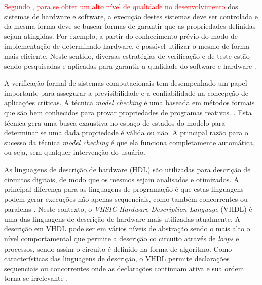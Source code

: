 \par
\textcolor{red}{Segundo \cite{rocha2015verificaccao}, para se obter um alto nível de qualidade no desenvolvimento} dos sistemas de hardware e software, a execução destes sistemas deve ser controlada e da mesma forma deve-se buscar formas de garantir que as propriedades definidas sejam atingidas. Por exemplo, a partir do conhecimento prévio do modo de implementação de determinado hardware, é possível utilizar o mesmo de forma mais eficiente. Neste sentido, diversas estratégias de verificação e de teste estão sendo pesquisadas e aplicadas para garantir a qualidade do software e hardware \cite{hoder2010interpolation,rocha2010exploiting,brayton2010abc,cordeiro2012smt,cabodi2016hardware}.

\par
A verificação formal de sistemas computacionais tem desempenhado um papel importante para assegurar a previsibilidade e a confiabilidade na concepção de aplicações críticas. A técnica \textit{model checking} é uma baseada em métodos formais que são bem conhecidos para provar propriedades de programas reativos. \cite{bensalem1999automatic}. Esta técnica gera uma busca exaustiva no espaço de estados do modelo para determinar se uma dada propriedade é válida ou não\cite{baier2008principles}. A principal razão para o sucesso da técnica \textit{model checking} é que ela funciona completamente automática, ou seja, sem qualquer intervenção do usuário.

\par
As linguagens de descrição de hardware (HDL) são utilizadas para descrição de circuitos digitais, de modo que os mesmos sejam analisados e otimizados. A principal diferença para as linguagens de programação é que estas linguagens podem gerar execuções não apenas sequenciais, como também concorrentes ou paralelas \cite{chu2006rtl}. Neste contexto, o \textit{VHSIC Hardware Description Language} (VHDL) é uma das linguagens de descrição de hardware mais utilizadas atualmente. A descrição em VHDL pode ser em vários níveis de abstração sendo o mais alto o nível comportamental que permite a descrição co circuito através de \textit{loops} e processos, sendo assim o circuito é definido na forma de algoritmo. Como características das linguagens de descrição, o VHDL permite declarações sequenciais ou concorrentes onde as declarações continuam ativa e sua ordem torna-se irrelevante \cite{cappelattipraticando}.

